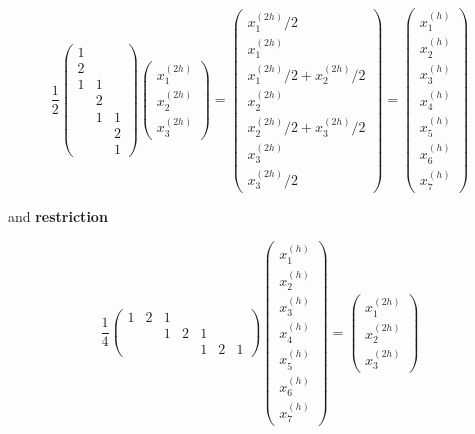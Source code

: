 \begin{equation}
    \frac{1}{2}\left(\begin{array}{lll}
    1 & & \\
    2 & & \\
    1 & 1 & \\
    & 2 & \\
    & 1 & 1 \\
    & & 2 \\
    & & 1
    \end{array}\right)\left(\begin{array}{l}
    x^{(2h)}_1 \\
    x^{(2h)}_2 \\
    x^{(2h)}_3
    \end{array}\right)=\left(\begin{array}{l}
    x^{(2h)}_1 / 2 \\
    x^{(2h)}_1 \\
    x^{(2h)}_1 / 2+x^{(2h)}_2 / 2 \\
    x^{(2h)}_2 \\
    x^{(2h)}_2 / 2+x^{(2h)}_3 / 2 \\
    x^{(2h)}_3 \\
    x^{(2h)}_3 / 2
    \end{array}\right)=\left(\begin{array}{l}
    x^{(h)}_1 \\
    x^{(h)}_2 \\
    x^{(h)}_3 \\
    x^{(h)}_4 \\
    x^{(h)}_5 \\
    x^{(h)}_6 \\
    x^{(h)}_7
    \end{array}\right)
\end{equation}

and \textbf{restriction}

\begin{equation}
    \frac{1}{4}\left(\begin{array}{lllllll}
    1 & 2 & 1 & & & & \\
    & & 1 & 2 & 1 & & \\
    & & & & 1 & 2 & 1
    \end{array}\right)\left(\begin{array}{l}
    x^{(h)}_1 \\
    x^{(h)}_2 \\
    x^{(h)}_3 \\
    x^{(h)}_4 \\
    x^{(h)}_5 \\
    x^{(h)}_6 \\
    x^{(h)}_7
    \end{array}\right)=\left(\begin{array}{l}
    x^{(2h)}_1 \\
    x^{(2h)}_2 \\
    x^{(2h)}_3
    \end{array}\right)
\end{equation}

